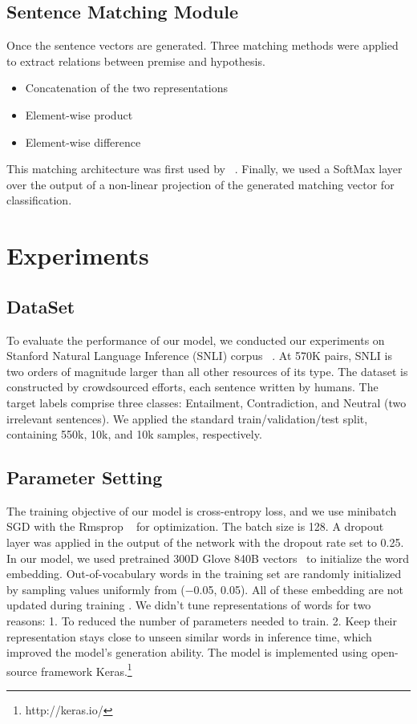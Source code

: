 \documentclass[11pt,letterpaper]{article}
\begin{document}
\subsection{Sentence Matching Module}
Once the sentence vectors are generated. Three matching methods were applied to extract relations between premise and hypothesis.
\begin{itemize}
\setlength{\itemsep}{0pt}
\setlength{\parsep}{0pt}
\setlength{\parskip}{0pt}
\item Concatenation of the two representations
\item Element-wise product
\item Element-wise difference
\end{itemize}
This matching architecture was first used by ~\cite{mou2015recognizing}.
Finally, we used a SoftMax layer over the output of a non-linear projection of the generated matching vector for classification.
\section{Experiments}
\label{sec:Experiments}
\subsection{DataSet}
To evaluate the performance of our model, we conducted our experiments on Stanford Natural Language Inference (SNLI) corpus ~\cite{bos2005recognising}. At 570K pairs, SNLI is two orders of magnitude larger than all other resources of its type. The dataset is constructed by crowdsourced efforts, each sentence written by humans. The target labels comprise three classes: Entailment, Contradiction, and Neutral (two irrelevant sentences). We applied the standard
train/validation/test split, containing 550k, 10k, and 10k samples, respectively.

\subsection{Parameter Setting}
The training objective of our model is cross-entropy loss, and we use minibatch SGD with the Rmsprop ~\cite{tieleman2012lecture} for optimization. The batch size is 128. A dropout layer was applied in the output of the network with the dropout rate set to 0.25. In our model, we used pretrained 300D Glove 840B vectors~\cite{pennington2014glove} to initialize the word embedding. Out-of-vocabulary words in the training set are randomly initialized by sampling values uniformly from (−0.05, 0.05). All of these embedding are not updated during training . We didn't tune representations of words for two reasons:
1. To reduced the number of parameters needed to train.
2. Keep their representation stays close to unseen similar words in inference time, which improved the model's generation ability.
The model is implemented using open-source framework Keras.\footnote{http://keras.io/}
\end{document}
